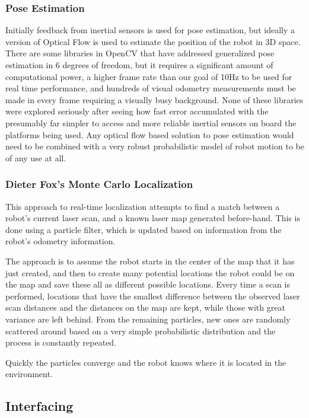 \documentclass{article}[12]
\begin{document}
		\subsubsection{Pose Estimation}
	
		Initially feedback from inertial sensors is used for pose estimation, but ideally a version of Optical Flow is used to estimate the position of the robot in 3D space. There are some libraries in OpenCV that have addressed generalized pose estimation in 6 degrees of freedom, but it requires a significant amount of computational power, a higher frame rate than our goal of 10Hz to be used for real time performance, and hundreds of visual odometry measurements must be made in every frame requiring a visually busy background. None of these libraries were explored seriously after seeing how fast error accumulated with the presumably far simpler to access and more reliable inertial sensors on board the platforms being used. Any optical flow based solution to pose estimation would need to be combined with a very robust probabilistic model of robot motion to be of any use at all.
		
		\subsubsection{Dieter Fox's Monte Carlo Localization}
		
		This approach to real-time localization attempts to find a match between a robot's current laser scan, and a known laser map generated before-hand. This is done using a particle filter, which is updated based on information from the robot's odometry information. 
		
		The approach is to assume the robot starts in the center of the map that it has just created, and then to create many potential locations the robot could be on the map and save these all as different possible locations. Every time a scan is performed, locations that have the smallest difference between the observed laser scan distances and the distances on the map are kept, while those with great variance are left behind. From the remaining particles, new ones are randomly scattered around based on a very simple probabilistic distribution and the process is constantly repeated. 
		
		Quickly the particles converge and the robot knows where it is located in the environment.

	\subsection{Interfacing}
	
\end{document}
